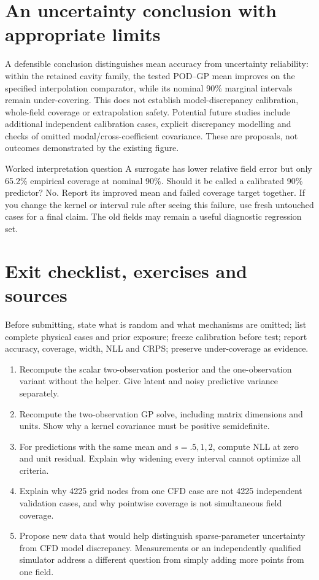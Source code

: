 \documentclass[11pt]{article}
\begin{document}
\section{An uncertainty conclusion with appropriate limits}
A defensible conclusion distinguishes mean accuracy from uncertainty reliability:
within the retained cavity family, the tested POD--GP mean improves on the
specified interpolation comparator, while its nominal 90\% marginal intervals
remain under-covering. This does not establish model-discrepancy calibration,
whole-field coverage or extrapolation safety. Potential future studies include
additional independent calibration cases, explicit discrepancy modelling and
checks of omitted modal/cross-coefficient covariance. These are proposals,
not outcomes demonstrated by the existing figure.

\begin{worked}{Worked interpretation question}
A surrogate has lower relative field error but only 65.2\% empirical coverage at
nominal 90\%. Should it be called a calibrated 90\% predictor? No. Report its
improved mean and failed coverage target together. If you change the kernel or
interval rule after seeing this failure, use fresh untouched cases for a final
claim. The old fields may remain a useful diagnostic regression set.
\end{worked}

\section{Exit checklist, exercises and sources}
Before submitting, state what is random and what mechanisms are omitted; list
complete physical cases and prior exposure; freeze calibration before test;
report accuracy, coverage, width, NLL and CRPS; preserve under-coverage as evidence.

\begin{enumerate}
\item Recompute the scalar two-observation posterior and the one-observation
variant without the helper. Give latent and noisy predictive variance separately.
\item Recompute the two-observation GP solve, including matrix dimensions and
units. Show why a kernel covariance must be positive semidefinite.
\item For predictions with the same mean and $s=.5,1,2$, compute NLL at zero and
unit residual. Explain why widening every interval cannot optimize all criteria.
\item Explain why 4225 grid nodes from one CFD case are not 4225 independent
validation cases, and why pointwise coverage is not simultaneous field coverage.
\item Propose new data that would help distinguish sparse-parameter uncertainty
from CFD model discrepancy. Measurements or an independently qualified simulator
address a different question from simply adding more points from one field.
\end{enumerate}
\end{document}
